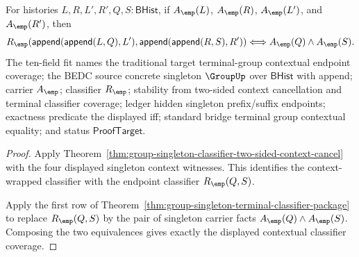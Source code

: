 \begin{theorem}
\label{thm:group-singleton-two-sided-contextual-classifier-coverage}
For histories $L,R,L',R',Q,S:\mathsf{BHist}$, if $A_{\emp}(L)$,
$A_{\emp}(R)$, $A_{\emp}(L')$, and $A_{\emp}(R')$, then
$$
R_{\emp}(\mathsf{append}(\mathsf{append}(L,Q),L'),
\mathsf{append}(\mathsf{append}(R,S),R'))
\Longleftrightarrow A_{\emp}(Q)\land A_{\emp}(S).
$$
The ten-field fit names the traditional target terminal-group contextual
endpoint coverage; the BEDC source concrete singleton $\GroupUp$ over
$\mathsf{BHist}$ with append; carrier $A_{\emp}$; classifier $R_{\emp}$;
stability from two-sided context cancellation and terminal classifier
coverage; ledger hidden singleton prefix/suffix endpoints; exactness predicate
the displayed iff; standard bridge terminal group contextual equality; and
status $\mathsf{ProofTarget}$.
\end{theorem}
\begin{proof}
Apply Theorem~\ref{thm:group-singleton-classifier-two-sided-context-cancel}
with the four displayed singleton context witnesses. This identifies the
context-wrapped classifier with the endpoint classifier $R_{\emp}(Q,S)$.

Apply the first row of
Theorem~\ref{thm:group-singleton-terminal-classifier-package} to replace
$R_{\emp}(Q,S)$ by the pair of singleton carrier facts
$A_{\emp}(Q)\land A_{\emp}(S)$. Composing the two equivalences gives exactly
the displayed contextual classifier coverage.
\end{proof}

